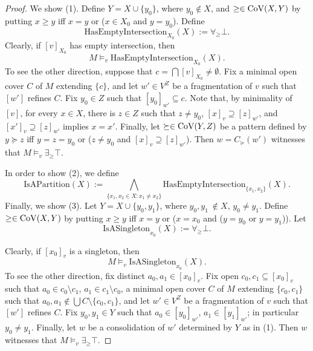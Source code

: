 \documentclass[12pt]{amsart}
\theoremstyle{plain}
\newcommand \rng{{\rm{ rng}}}
\newcommand \Val{{\rm{CoV}}}
\begin{document}
\begin{proof}
	
	We show (1). Define $Y=X \cup \{y_0\}$, where $y_0 \not \in X$, and $\geq \in \Val(X,Y)$ by putting $x \geq y$ iff $x=y$ or ($x \in X_0$ and $y=y_0$). Define
	\[ \text{HasEmptyIntersection}_{X_0}(X):= \forall_{\geq} \bot.\]
	Clearly, if $[v]_{X_0}$ has empty intersection, then $$M \models_v \text{HasEmptyIntersection}_{X_0}(X).$$ To see the other direction, suppose that $c=\bigcap [v]_{X_0 } \neq \emptyset$. Fix a minimal open cover $C$ of $M$ extending $\{c\}$,  and  let $w' \in V^Z$ be a fragmentation of $v$ such that $[w']$ refines $C$. Fix $y_0 \in Z$ such that $[y_0]_{w'} \subseteq c$. Note that, by minimality of $[v] $, for every $x \in X$, there is $z \in Z$ such that $z \neq y_0$, $[x]_v \supseteq [z]_{w'}$, and $[x']_v \supseteq [z]_{w'}$ implies $x=x'$.  Finally, let $\succeq \in \Val(Y,Z)$ be a pattern defined by $y \succeq z$ iff $y=z=y_0$ or ($z \neq y_0$ and  $[x]_v \supseteq [z]_{w'}$). Then $w=C_\succeq (w')$ witnesses that $M  \models_v   \exists_{\geq} \top$.
	
	
	
	In order to show (2), we define 
	\[\text{IsAPartition}(X):= \bigwedge_{\{x_1,x_2 \in X: x_1 \neq x_2\}} \text{HasEmptyIntersection}_{\{x_1,x_2\}}(X).\]
	Finally, we show (3). Let $Y=X \cup \{y_0,y_1\}$, where $y_0,y_1\ \not \in X$, $y_0 \neq y_1$.  Define $\geq \in \Val(X,Y)$ by putting $x \geq y$ iff $x=y$ or ($x=x_0$ and  ($y=y_0$ or $y=y_1$)). Let
	\[\text{IsASingleton}_{x_0}(X):=\forall_{\geq} \bot .\]
	
	Clearly, if $[x_0]_v$ is a singleton, then $$M \models_v \text{IsASingleton}_{x_0}(X).$$ To see the other direction, fix distinct $a_0, a_1 \in [x_0]_v$. Fix open $c_0, c_1 \subseteq [x_0]_v$ such that $a_0 \in c_0 \setminus c_1$, $a_1 \in c_1 \setminus c_0$,  a minimal open cover $C$ of $M$ extending $\{c_0, c_1\}$ such that $a_0, a_1 \not \in \bigcup C \setminus \{c_0,c_1\}$,  and  let $w' \in V^Z$ be a fragmentation of $v$ such that $[w']$ refines $C$. Fix $y_0, y_1 \in Y$  such that $a_0 \in [y_0]_{w'}$, $a_1 \in [y_1]_{w'}$; in particular $y_0 \neq y_1$.  Finally, let $w$ be a consolidation of $w'$ determined by $Y$ as in (1). Then $w$ witnesses that $M  \models_v   \exists_{\geq} \top$.
\end{proof}
\end{document}
